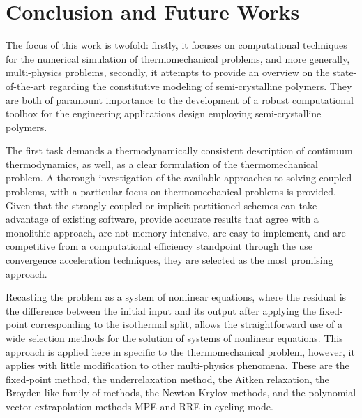 \chapter{Conclusion and Future Works} \label{ch:conclusions}

The focus of this work is twofold: firstly, it focuses on computational techniques for the numerical simulation of thermomechanical problems, and more generally, multi-physics problems, secondly, it attempts to provide an overview on the state-of-the-art regarding the constitutive modeling of semi-crystalline polymers.
They are both of paramount importance to the development of a robust computational toolbox for the engineering applications design employing semi-crystalline polymers.

The first task demands a thermodynamically consistent description of continuum thermodynamics, as well, as a clear formulation of the thermomechanical problem.
A thorough investigation of the available approaches to solving coupled problems, with a particular focus on thermomechanical problems is provided.
Given that the strongly coupled or implicit partitioned schemes can take advantage of existing software, provide accurate results that agree with a monolithic approach, are not memory intensive, are easy to implement, and are competitive from a computational efficiency standpoint through the use convergence acceleration techniques, they are selected as the most promising approach.

Recasting the problem as a system of nonlinear equations, where the residual is the difference between the initial input and its output after applying the fixed-point corresponding to the isothermal split, allows the straightforward use of a wide selection methods for the solution of systems of nonlinear equations.
This approach is applied here in specific to the thermomechanical problem, however, it applies with little modification to other multi-physics phenomena.
These are the fixed-point method, the underrelaxation method, the Aitken relaxation, the Broyden-like family of methods, the Newton-Krylov methods, and the polynomial vector extrapolation methods MPE and RRE in cycling mode.

